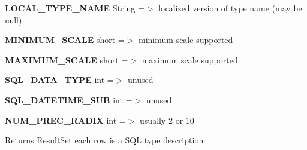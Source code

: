 \begin{DoxyEnumerate}
\item {\bfseries L\+O\+C\+A\+L\+\_\+\+T\+Y\+P\+E\+\_\+\+N\+A\+ME} String =$>$ localized version of type name (may be null) 
\item {\bfseries M\+I\+N\+I\+M\+U\+M\+\_\+\+S\+C\+A\+LE} short =$>$ minimum scale supported 
\item {\bfseries M\+A\+X\+I\+M\+U\+M\+\_\+\+S\+C\+A\+LE} short =$>$ maximum scale supported 
\item {\bfseries S\+Q\+L\+\_\+\+D\+A\+T\+A\+\_\+\+T\+Y\+PE} int =$>$ unused 
\item {\bfseries S\+Q\+L\+\_\+\+D\+A\+T\+E\+T\+I\+M\+E\+\_\+\+S\+UB} int =$>$ unused 
\item {\bfseries N\+U\+M\+\_\+\+P\+R\+E\+C\+\_\+\+R\+A\+D\+IX} int =$>$ usually 2 or 10 
\end{DoxyEnumerate}

\begin{DoxyReturn}{Returns}
Result\+Set each row is a S\+QL type description 
\end{DoxyReturn}

